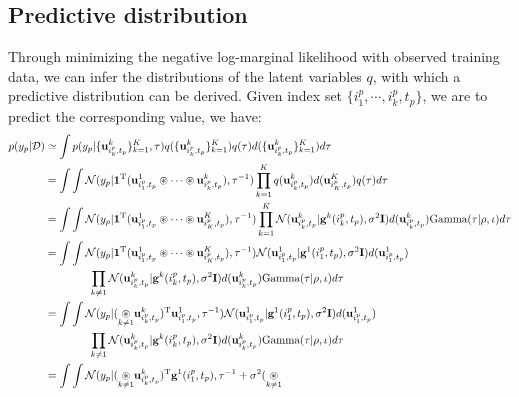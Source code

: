 \subsection{Predictive distribution}
\label{pred_distr}
Through minimizing the negative log-marginal likelihood with observed training data, we can infer the distributions of the latent variables $q$, with which a predictive distribution  can be derived. Given index set $\{i^p_1,\cdots, i^p_k, t_p\}$, we are to predict the corresponding value, we have:
\begin{equation}
    \begin{split}
        p(y_p|\mathcal{D}) &\simeq \int p(y_p|\{\mf{u}^{k}_{i_k^p, t_p}\}_{k=1}^K, \tau)q(\{\mf{u}^{k}_{i_k^p, t_p}\}_{k=1}^K)q(\tau)d(\{\mf{u}^{k}_{i_k^p, t_p}\}_{k=1}^K) d\tau\\
        &=\int\int \mathcal{N}(y_p|\boldsymbol{1}^{\T}(\mf{u}^{1}_{i_1^p, t_p} \circledast \cdots \circledast \mf{u}^{k}_{i_k^p, t_p}),\tau^{-1}) \prod_{k=1}^K
        q(\mf{u}^{k}_{i_k^p, t_p})d(\mf{u}^{K}_{i_K^p, t_p})q(\tau)d\tau\\
        &=\int\int \mathcal{N}(y_p|\boldsymbol{1}^{\T}(\mf{u}^{1}_{i_1^p, t_p} \circledast \cdots \circledast \mf{u}^{K}_{i_K^p, t_p}),\tau^{-1}) \prod_{k=1}^K \mathcal{N}(\mf{u}^{k}_{i_k^p, t_p}|\mathbf{g}^k(i_k^p, t_p),\sigma^2\mf{I})d(\mf{u}^{k}_{i_k^p, t_p}) \text{Gamma}(\tau|\rho, \iota)d\tau\\
        &=\int\int \mathcal{N}(y_p|\boldsymbol{1}^{\T}(\mf{u}^{1}_{i_1^p, t_p} \circledast \cdots \circledast \mf{u}^{K}_{i_K^p, t_p}),\tau^{-1})\mathcal{N}(\mf{u}^{1}_{i_1^p, t_p}|\mathbf{g}^1(i_1^p, t_p),\sigma^2\mf{I})d(\mf{u}^{1}_{i_1^p, t_p}) \\& \qquad \qquad \prod_{k\ne 1} \mathcal{N}(\mf{u}^{k}_{i_k^p, t_p}|\mathbf{g}^k(i_k^p, t_p),\sigma^2\mf{I})d(\mf{u}^{k}_{i_k^p, t_p}) \text{Gamma}(\tau|\rho, \iota)d\tau \\
        &= \int\int \mathcal{N}(y_p|(\underset{k\ne 1}{\circledast} 
 \mf{u}^{k}_{i_k^p, t_p})^{\T}\mf{u}^{1}_{i_1^p, t_p} ,\tau^{-1})\mathcal{N}(\mf{u}^{1}_{i_1^p, t_p}|\mathbf{g}^1(i_1^p, t_p),\sigma^2\mf{I})d(\mf{u}^{1}_{i_1^p, t_p}) \\& \qquad \qquad\prod_{k\ne 1} \mathcal{N}(\mf{u}^{k}_{i_k^p, t_p}|\mathbf{g}^k(i_k^p, t_p),\sigma^2\mf{I})d(\mf{u}^{k}_{i_k^p, t_p}) \text{Gamma}(\tau|\rho, \iota)d\tau\\
 & = \int\int \mathcal{N}(y_p|(\underset{k\ne 1}{\circledast} 
 \mf{u}^{k}_{i_k^p, t_p})^{\T}\mathbf{g}^1(i_1^p, t_p) ,\tau^{-1}+\sigma^2(\underset{k\ne 1}{\circledast} 

\end{split}
\end{equation}
